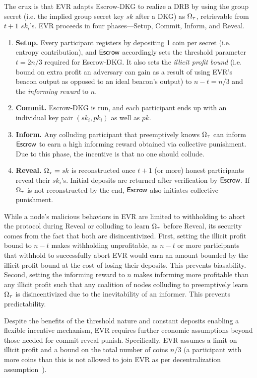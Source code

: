 The crux is that EVR adapts Escrow-DKG to realize a DRB by using the group secret (i.e. the implied group secret key $sk$ after a DKG) as $\Omega_\tau$, retrievable from $t + 1$ $sk_i$'s. EVR proceeds in four phases---Setup, Commit, Inform, and Reveal.
\begin{enumerate}
    \item \textbf{Setup.} Every participant registers by depositing 1 coin per secret (i.e. entropy contribution), and $\mathsf{Escrow}$ accordingly sets the threshold parameter $t = 2n / 3$ required for Escrow-DKG. It also sets the \textit{illicit profit bound} (i.e. bound on extra profit an adversary can gain as a result of using EVR's beacon output as opposed to an ideal beacon's output) to $n - t = n / 3$ and the \textit{informing reward} to $n$.
    \item \textbf{Commit.} Escrow-DKG is run, and each participant ends up with an individual key pair $(sk_i, pk_i)$ as well as $pk$.
    \item \textbf{Inform.} Any colluding participant that preemptively knows $\Omega_\tau$ can inform $\mathsf{Escrow}$ to earn a high informing reward obtained via collective punishment. Due to this phase, the incentive is that no one should collude.
    \item \textbf{Reveal.} $\Omega_\tau = sk$ is reconstructed once $t + 1$ (or more) honest participants reveal their $sk_i$'s. Initial deposits are returned after verification by $\mathsf{Escrow}$. If $\Omega_\tau$ is not reconstructed by the end, $\mathsf{Escrow}$ also initiates collective punishment.
\end{enumerate}

While a node's malicious behaviors in EVR are limited to withholding to abort the protocol during Reveal or colluding to learn $\Omega_\tau$ before Reveal, its security comes from the fact that both are disincentivized. First, setting the illicit profit bound to $n - t$ makes withholding unprofitable, as $n - t$ or more participants that withhold to successfully abort EVR would earn an amount bounded by the illicit profit bound at the cost of losing their deposits. This prevents biasability. Second, setting the informing reward to $n$ makes informing more profitable than any illicit profit such that any coalition of nodes colluding to preemptively learn $\Omega_\tau$ is disincentivized due to the inevitability of an informer. This prevents predictability.

Despite the benefits of the threshold nature and constant deposits enabling a flexible incentive mechanism, EVR requires further economic assumptions beyond those needed for commit-reveal-punish. Specifically, EVR assumes a limit on illicit profit and a bound on the total number of coins $n / 3$ (a participant with more coins than this is not allowed to join EVR as per decentralization assumption~\cite{david2020economically}).

